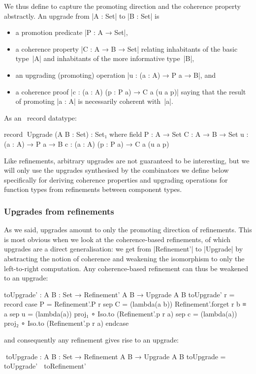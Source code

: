 We thus define  to capture the promoting direction and the coherence property abstractly.
An upgrade from |A : Set| to |B : Set| is
\begin{itemize}
\item a promotion predicate |P : A → Set|,
\item a coherence property |C : A → B → Set| relating inhabitants of the basic type~|A| and inhabitants of the more informative type~|B|,
\item an upgrading (promoting) operation |u : (a : A) → P a → B|, and
\item a coherence proof |c : (a : A) (p : P a) → C a (u a p)| saying that the result of promoting |a : A| is necessarily coherent with~|a|.
\end{itemize}
As an \Agda\ record datatype:
\begin{code}
record ^^^Upgrade (A B : Set) : Set₁ where
  field
    P  :  A → Set
    C  :  A → B → Set
    u  :  (a : A) → P a → B
    c  :  (a : A) (p : P a) → C a (u a p)
\end{code}
Like refinements, arbitrary upgrades are not guaranteed to be interesting, but we will only use the upgrades synthesised by the combinators we define below specifically for deriving coherence properties and upgrading operations for function types from refinements between component types.

\subsubsection{Upgrades from refinements}

As we said, upgrades amount to only the promoting direction of refinements.
This is most obvious when we look at the coherence-based refinements, of which upgrades are a direct generalisation: we get from |Refinement'| to |Upgrade| by abstracting the notion of coherence and weakening the isomorphism to only the left-to-right computation.
Any coherence-based refinement can thus be weakened to an upgrade:
\begin{code}
toUpgrade' : {A B : Set} → Refinement' A B → Upgrade A B
toUpgrade' r = record  case  P  =  Refinement'.P r
                       sep   C  =  (lambda(a b)) Refinement'.forget r b ≡ a
                       sep   u  =  (lambda(a)) proj₁  ∘ Iso.to (Refinement'.p r a)
                       sep   c  =  (lambda(a)) proj₂  ∘ Iso.to (Refinement'.p r a) endcase
\end{code}
and consequently any refinement gives rise to an upgrade:
\begin{code}
^^^toUpgrade : {A B : Set} → Refinement A B → Upgrade A B
toUpgrade = toUpgrade' ∘ toRefinement'
\end{code}

